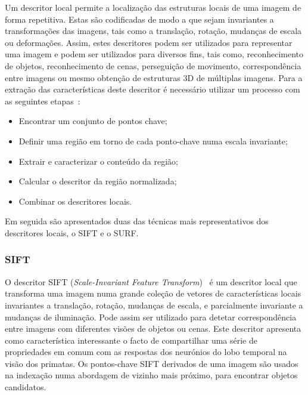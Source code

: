 Um descritor local permite a localização das estruturas locais de uma imagem de forma repetitiva. Estas são codificadas de modo a que sejam invariantes a transformações das imagens, tais como a translação, rotação, mudanças de escala ou deformações. Assim, estes descritores podem ser utilizados para representar uma imagem e podem ser utilizados para diversos fins, tais como, reconhecimento de objetos, reconhecimento de cenas, perseguição de movimento, correspondência entre imagens ou mesmo obtenção de estruturas 3D de múltiplas imagens. 
Para a extração das características deste descritor é necessário utilizar um processo com as seguintes etapas~\cite{Gauman2010}:

\begin{itemize}
\item Encontrar um conjunto de pontos chave;
\item Definir uma região em torno de cada ponto-chave numa escala invariante;
\item Extrair e caracterizar o conteúdo da região;
\item Calcular o descritor da região normalizada;
\item Combinar os descritores locais.
\end{itemize}

Em seguida são apresentados duas das técnicas mais representativos dos descritores locais, o SIFT e o SURF.

\subsubsection{SIFT} \label{subsubsec:sift}

O descritor SIFT (\textit{Scale-Invariant Feature Transform})~\cite{Lowe1999, Lowe2004} é um descritor local que transforma uma imagem numa grande coleção de vetores de características locais invariantes a translação, rotação, mudanças de escala, e parcialmente invariante a mudanças de iluminação. Pode assim ser utilizado para detetar correspondência entre imagens com diferentes visões de objetos ou cenas.
Este descritor apresenta como característica interessante o facto de compartilhar uma série de propriedades em comum com as respostas dos neurónios do lobo temporal na visão dos primatas. Os pontos-chave SIFT derivados de uma imagem são usados na indexação numa abordagem de vizinho mais próximo, para encontrar objetos candidatos.

